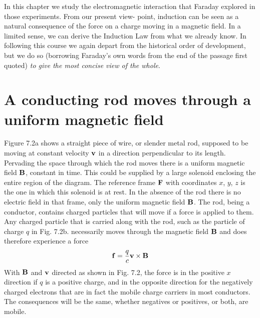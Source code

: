 In this chapter we study the electromagnetic interaction that
Faraday explored in those experiments. From our present view-
point, induction can be seen as a natural consequence of the force on
a charge moving in a magnetic field. In a limited sense, we can derive
the Induction Law from what we already know. In following this
course we again depart from the historical order of development, but
we do so (borrowing Faraday's own words from the end of the
passage first quoted) \emph{to give the most concise view of the whole}.

\section[A conducting rod moves through a uniform magnetic field]
      [A conducting rod moves through a magnetic field]{A conducting rod moves through a uniform magnetic field}

Figure 7.2a shows a straight piece of wire, or slender metal rod,
supposed to be moving at constant velocity $\mathbf{v}$ in a direction perpendicular
to its length. Pervading the space through which the rod
moves there is a uniform magnetic field $\mathbf{B}$, constant in time. This
could be supplied by a large solenoid enclosing the entire region of
the diagram. The reference frame $\mathbf{F}$ with coordinates $x$, $y$, $z$ is the
one in which this solenoid is at rest. In the absence of the rod there
is no electric field in that frame, only the uniform magnetic field $\mathbf{B}$.
The rod, being a conductor, contains charged particles that will
move if a force is applied to them. Any charged particle that is
carried along with the rod, such as the particle of charge $q$ in Fig. 7.2b.
necessarily moves through the magnetic field $\mathbf{B}$ and does therefore
experience a force
\begin{equation}
  \mathbf{f} = \frac{q}{c}\mathbf{v}\times\mathbf{B}
\end{equation}
With $\mathbf{B}$ and $\mathbf{v}$ directed as shown in Fig. 7.2, the force is in the positive
$x$ direction if $q$ is a positive charge, and in the opposite direction for
the negatively charged electrons that are in fact the mobile charge
carriers in most conductors. The consequences will be the same,
whether negatives or positives, or both, are mobile.

